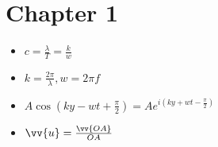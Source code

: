 \documentclass[12pt]{book}
\begin{document}
        \section*{Chapter 1}
            \begin{itemize}
                \item $ c = \frac{\lambda}{T} = \frac{k}{w} $\\
                \item $ k=\frac{2\pi}{\lambda} , w =2\pi f $\\
                \item $ A\cos(ky-wt+\frac{\pi}{2})=Ae^{i(ky+wt-\frac{\pi}{2})} $ \\
                \item $ \vv{u} = \frac{\vv{OA}}{OA} $
            \end{itemize}
\end{document}
